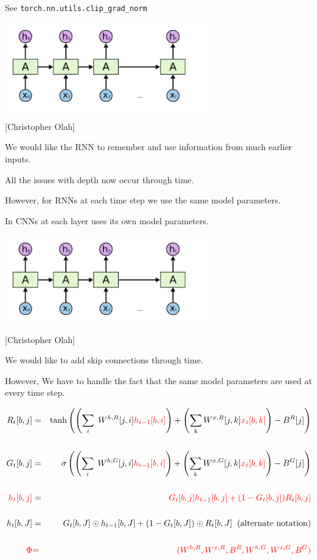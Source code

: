 {\vfill
See {\tt torch.nn.utils.clip\_grad\_norm}


\centerline{\includegraphics[width=3.5in]{../images/RNN}}
\centerline{{\large [Christopher Olah]}}

\vfill
We would like the RNN to {\color{red} remember and use} information from much earlier inputs.


\vfill
All the issues with depth now occur through time.

\vfill
However, for RNNs {\color{red} at each time step we use the same model parameters.}

\vfill
In CNNs {\color{red} at each layer uses its own model parameters.}


\centerline{\includegraphics[width=3.5in]{../images/RNN}}
\centerline{{\large [Christopher Olah]}}

\vfill
We would like to add {\color{red} skip connections through time}.

\vfill
However, We have to handle the fact that the same model parameters are used at every time step.


{\huge
\begin{eqnarray*}
R_t[b,j] & = & \mathrm{tanh}\left(\left(\sum_i\;W^{h,R}[j,i]{\color{red} h_{t-1}[b,i]}\right) + \left(\sum_k W^{x,R}[j,k]{\color{red} x_t[b,k]}\right) - B^R[j]\right) \\
\\
G_t[b,j] & = & \sigma\left(\left(\sum_i\;W^{h,G}[j,i]{\color{red} h_{t-1}[b,i]}\right) + \left(\sum_k W^{x,G}[j,k]{\color{red} x_t[b,k]}\right) - B^G[j]\right) \\
\\
{\color{red} h_t[b,j]} & = & {\color{red} G_t[b,j]h_{t-1}[b,j] + (1-G_t[b,j])R_t[b,j]} \\
\\
h_t[b,J] & = & G_t[b,J] \odot h_{t-1}[b,J] + (1-G_t[b,J])\odot R_t[b,J]\;\;\mbox{(alternate notation)} \\
\\
{\color{red} \Phi} & {\color{red} =} & {\color{red} (W^{h,R},W^{x,R},B^R,W^{h,G},W^{x,G},B^G)}
\end{eqnarray*}
}

}
